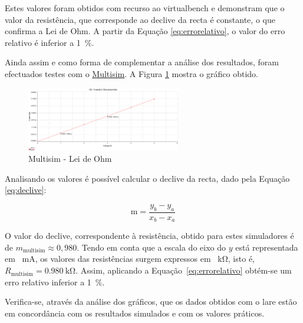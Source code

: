 Estes valores foram obtidos com recurso ao \acrshort{virtualbench} e demonstram que o valor da resistência, que corresponde ao declive da recta é constante, o que confirma a Lei de Ohm. A partir da Equação \ref{eq:errorelativo}, o valor do erro relativo é inferior a \SI{1}{\percent}. 

Ainda assim e como forma de complementar a análise dos resultados, foram efectuados testes com o \href{https://www.multisim.com}{Multisim}. A Figura \ref{fig:multisimOHM} mostra o gráfico obtido.

\begin{figure}[hbtp]
	\centering
	\includegraphics[width=0.6\textwidth]{figures/OHM_resultado_multisim.png}
	\caption{Multisim - Lei de Ohm}
	\label{fig:multisimOHM}
\end{figure}

Analisando os valores é possível calcular o declive da recta, dado pela Equação \ref{eq:declive}:

\begin{equation} \label{eq:declive}
	\text{m} = \frac{y_{b} - y_{a}}{x_{b} - x_{a}}
\end{equation}

O valor do declive, correspondente à resistência, obtido para estes simuladores é de $m_\text{{multisim}} \approx{0,980}$. Tendo em conta que a escala do eixo do $y$ está representada em \SI{}{\milli\ampere}, os valores das resistências surgem expressos em \SI{}{\kilo\ohm}, isto é, $R_\text{{multisim}} = \SI{0,980}{\kilo\ohm}$. Assim, aplicando a Equação~\ref{eq:errorelativo} obtém-se um erro relativo inferior a \SI{1}{\percent}.

Verifica-se, através da análise dos gráficos, que os dados obtidos com o \acrshort{lare} estão em concordância com os resultados simulados e com os valores práticos.

